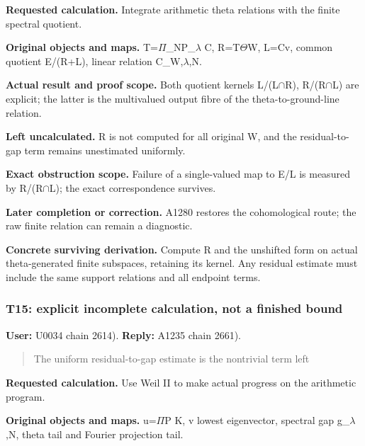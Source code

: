 \textbf{Requested calculation.} Integrate arithmetic theta relations
with the finite spectral quotient.

\textbf{Original objects and maps.}
T=\allowbreak{}\ensuremath{Π}\allowbreak{}\_NP\_\allowbreak{}\ensuremath{λ}\allowbreak{}
C, R=T\allowbreak{}\ensuremath{Θ}\allowbreak{}W, L=Cv, common quotient
E/(R+L), linear relation
C\_W,\allowbreak{}\ensuremath{λ}\allowbreak{},N.

\textbf{Actual result and proof scope.} Both quotient kernels
L/(L\allowbreak{}\ensuremath{∩}\allowbreak{}R),
R/(R\allowbreak{}\ensuremath{∩}\allowbreak{}L) are explicit; the latter
is the multivalued output fibre of the theta-to-ground-line relation.

\textbf{Left uncalculated.} R is not computed for all original W, and
the residual-to-gap term remains unestimated uniformly.

\textbf{Exact obstruction scope.} Failure of a single-valued map to E/L
is measured by R/(R\allowbreak{}\ensuremath{∩}\allowbreak{}L); the exact
correspondence survives.

\textbf{Later completion or correction.} A1280 restores the
cohomological route; the raw finite relation can remain a diagnostic.

\textbf{Concrete surviving derivation.} Compute R and the unshifted form
on actual theta-generated finite subspaces, retaining its kernel. Any
residual estimate must include the same support relations and all
endpoint terms.

\subsubsection{T15: explicit incomplete calculation, not a finished
bound}\label{TranscriptLedgerStage:t15-explicit-incomplete-calculation-not-a-finished-bound}

\textbf{User:} U0034
\protect{} chain 2614).
\textbf{Reply:} A1235
\protect{} chain 2661).

\begin{quote}
The uniform residual-to-gap estimate is the nontrivial term left
\end{quote}

\textbf{Requested calculation.} Use Weil II to make actual progress on
the arithmetic program.

\textbf{Original objects and maps.}
u=\allowbreak{}\ensuremath{Π}\allowbreak{}P K, v lowest eigenvector,
spectral gap g\_\allowbreak{}\ensuremath{λ}\allowbreak{},N, theta tail
and Fourier projection tail.

